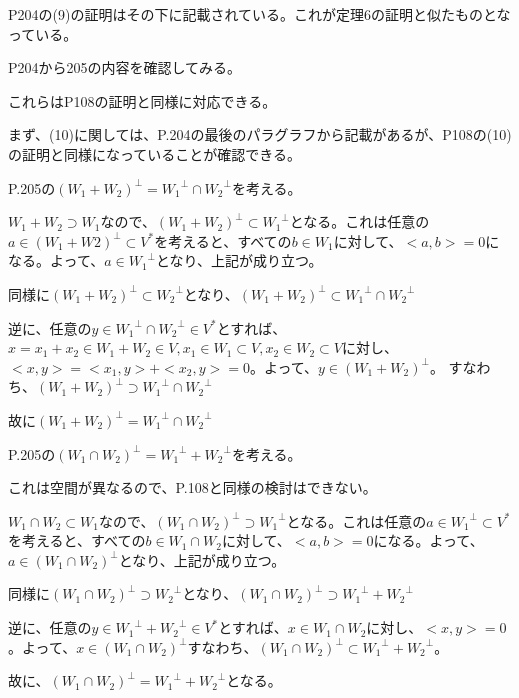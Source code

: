 \documentclass{jsarticle}
\begin{document}
P204の(9)の証明はその下に記載されている。これが定理6の証明と似たものとなっている。

P204から205の内容を確認してみる。

これらはP108の証明と同様に対応できる。

まず、(10)に関しては、P.204の最後のパラグラフから記載があるが、P108の(10)の証明と同様になっていることが確認できる。

P.205の$(W_1 + W_2)^{\perp} = {W_1}^{\perp} \cap {W_2}^{\perp}$を考える。

$W_1 + W_2 \supset {W_1}$なので、$(W_1 + W_2)^{\perp} \subset {W_1}^{\perp}$となる。これは任意の$a \in {(W_1 + W2)}^{\perp} \subset V^*$を考えると、すべての$b \in W_1$に対して、$<a, b> = 0$になる。よって、$a \in {W_1}^{\perp}$となり、上記が成り立つ。

同様に$(W_1 + W_2)^{\perp} \subset {W_2}^{\perp}$となり、$(W_1 + W_2)^{\perp} \subset {W_1}^{\perp} \cap {W_2}^{\perp}$

逆に、任意の$y \in {W_1}^{\perp} \cap {W_2}^{\perp} \in V^*$とすれば、$x = x_1 + x_2 \in W_1 + W_2 \in V, x_1 \in W_1 \subset V, x_2 \in W_2 \subset V$に対し、$<x, y> = <x_1, y> + <x_2, y> = 0$。よって、$y \in (W_1 + W_2)^{\perp}$。
すなわち、$(W_1 + W_2)^{\perp} \supset {W_1}^{\perp} \cap {W_2}^{\perp}$

故に$(W_1 + W_2)^{\perp} = {W_1}^{\perp} \cap {W_2}^{\perp}$

P.205の$(W_1 \cap W_2)^{\perp} = {W_1}^{\perp} + {W_2}^{\perp}$を考える。

これは空間が異なるので、P.108と同様の検討はできない。

$W_1 \cap W_2 \subset W_1$なので、$(W_1 \cap W_2)^{\perp} \supset {W_1}^{\perp}$となる。これは任意の$a \in {W_1}^{\perp} \subset V^*$を考えると、すべての$b \in W_1 \cap W_2$に対して、$<a, b> = 0$になる。よって、$a \in {(W_1 \cap W_2)}^{\perp}$となり、上記が成り立つ。

同様に$(W_1 \cap W_2)^{\perp} \supset {W_2}^{\perp}$となり、$(W_1 \cap W_2)^{\perp} \supset {W_1}^{\perp} + {W_2}^{\perp}$

逆に、任意の$y \in {W_1}^{\perp} + {W_2}^{\perp} \in V^*$とすれば、$x \in W_1 \cap W_2$に対し、$<x, y> = 0$。よって、$x \in (W_1 \cap W_2)^{\perp}$すなわち、$(W_1 \cap W_2)^{\perp} \subset {W_1}^{\perp} + {W_2}^{\perp}$。

故に、$(W_1 \cap W_2)^{\perp} = {W_1}^{\perp} + {W_2}^{\perp}$となる。
\end{document}
